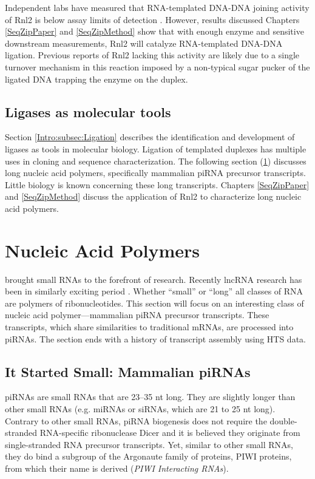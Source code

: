     Independent labs have measured that RNA-templated DNA-DNA joining activity of Rnl2 is below assay limits of detection \citep{Bullard2006}. However, results discussed Chapters \ref{SeqZipPaper} and \ref{SeqZipMethod} show that with enough enzyme and sensitive downstream measurements, Rnl2 will catalyze RNA-templated DNA-DNA ligation. Previous reports of Rnl2 lacking this activity are likely due to a single turnover mechanism in this reaction imposed by a non-typical sugar pucker of the ligated DNA trapping the enzyme on the duplex.

  \subsection{Ligases as molecular tools}

    Section \ref{Intro:subsec:Ligation} describes the identification and development of ligases as tools in molecular biology. Ligation of templated duplexes has multiple uses in cloning and sequence characterization. The following section (\ref{Intro:sec:Nucleic Acid Polymers}) discusses long nucleic acid polymers, specifically mammalian piRNA precursor transcripts. Little biology is known concerning these long transcripts. Chapters \ref{SeqZipPaper} and \ref{SeqZipMethod} discuss the application of Rnl2 to characterize long nucleic acid polymers.

\section{Nucleic Acid Polymers}
  \label{Intro:sec:Nucleic Acid Polymers}

  \citet{Fire1998} brought small RNAs to the forefront of research. Recently lncRNA research has been in similarly exciting period \citep{Khalil2009,Guttman2009}. Whether ``small'' or ``long'' all classes of RNA are polymers of ribonucleotides. This section will focus on an interesting class of nucleic acid polymer---mammalian piRNA precursor transcripts. These transcripts, which share similarities to traditional mRNAs, are processed into piRNAs. The section ends with a history of transcript assembly using HTS data.

  \subsection{It Started Small: Mammalian piRNAs}
  
    piRNAs are small RNAs that are 23--35 nt long. They are slightly longer than other small RNAs (e.g. miRNAs or siRNAs, which are 21 to 25 nt long). Contrary to other small RNAs, piRNA biogenesis does not require the double-stranded RNA-specific ribonuclease Dicer \citep{Vagin2006, Houwing2007} and it is believed they originate from single-stranded RNA precursor transcripts. Yet, similar to other small RNAs, they do bind a subgroup of the Argonaute family of proteins, PIWI proteins, from which their name is derived (\textit{PIWI Interacting RNAs}). 

